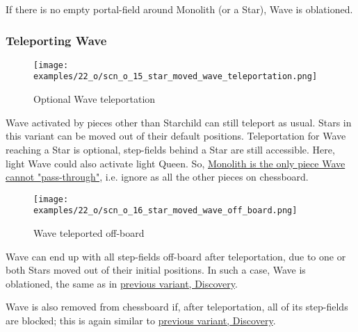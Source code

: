 If there is no empty portal-field around Monolith (or a Star), Wave is oblationed.

\clearpage %

\subsubsection*{Teleporting Wave}

\vspace*{-0.9\baselineskip}
\noindent
\begin{figure}[!h]
\texttt{[image: examples/22\_o/scn\_o\_15\_star\_moved\_wave\_teleportation.png]}
\caption{Optional Wave teleportation}
\label{fig:scn_o_15_star_moved_wave_teleportation}
\end{figure}

\vspace*{-0.3\baselineskip}
Wave activated by pieces other than Starchild can still teleport as usual. Stars in this variant
can be moved out of their default positions. Teleportation for Wave reaching a Star is optional,
step-fields behind a Star are still accessible. Here, light Wave could also activate light Queen. So,
\hyperref[fig:scn_d_10_teleport_wave_via_monolith]{Monolith is the only piece Wave cannot "pass-through"},
i.e. ignore as all the other pieces on chessboard.

\clearpage %

\vspace*{-2.1\baselineskip}
\noindent
\begin{figure}[!h]
\texttt{[image: examples/22\_o/scn\_o\_16\_star\_moved\_wave\_off\_board.png]}
\caption{Wave teleported off-board}
\label{fig:scn_o_16_star_moved_wave_off_board}
\end{figure}

Wave can end up with all step-fields off-board after teleportation, due to one or both Stars
moved out of their initial positions. In such a case, Wave is oblationed, the same as in
\hyperref[fig:scn_d_12_wave_teleported_off_board]{previous variant, Discovery}.

Wave is also removed from chessboard if, after teleportation, all of its step-fields are
blocked; this is again similar to
\hyperref[fig:scn_d_11_teleported_wave_blocked]{previous variant, Discovery}.

